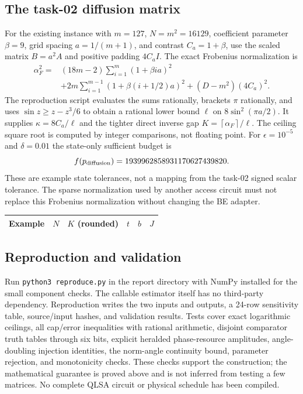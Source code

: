 \documentclass[11pt]{article}
\newcommand{\ceil}[1]{\left\lceil #1\right\rceil}
\begin{document}
\subsection{The task-02 diffusion matrix}
For the existing instance with $m=127$, $N=m^2=16129$, coefficient parameter $\beta=9$, grid spacing $a=1/(m+1)$, and contrast $C_a=1+\beta$, use the scaled matrix $B=a^2A$ and positive padding $4C_aI$. The exact Frobenius normalization is
\begin{align}
 \alpha_F^2={}&(18m-2)\sum_{i=1}^{m}(1+\beta ia)^2\nonumber\\
 &+2m\sum_{i=1}^{m-1}(1+\beta(i+1/2)a)^2
 +(D-m^2)(4C_a)^2.
\end{align}
The reproduction script evaluates the sums rationally, brackets $\pi$ rationally, and uses $\sin z\ge z-z^3/6$ to obtain a rational lower bound $\ell$ on $8\sin^2(\pi a/2)$. It supplies $\kappa=8C_a/\ell$ and the tighter direct inverse gap $K=\ceil{\alpha_F}/\ell$. The ceiling square root is computed by integer comparisons, not floating point. For $\epsilon=10^{-5}$ and $\delta=0.01$ the state-only sufficient budget is
\begin{equation}
 f(p_{\rm diffusion})=1939962858931170627439820.
\end{equation}
These are example state tolerances, not a mapping from the task-02 signed scalar tolerance. The sparse normalization used by another access circuit must not replace this Frobenius normalization without changing the BE adapter.
\begin{center}
\begin{tabular}{lrrrrr}
\toprule
Example & $N$ & $K$ (rounded) & $t$ & $b$ & $J$\\\midrule

\end{tabular}
\end{center}

\subsection{Reproduction and validation}
Run \texttt{python3 reproduce.py} in the report directory with NumPy installed for the small component checks. The callable estimator itself has no third-party dependency. Reproduction writes the two inputs and outputs, a 24-row sensitivity table, source/input hashes, and validation results. Tests cover exact logarithmic ceilings, all cap/error inequalities with rational arithmetic, disjoint comparator truth tables through six bits, explicit heralded phase-resource amplitudes, angle-doubling injection identities, the norm-angle continuity bound, parameter rejection, and monotonicity checks. These checks support the construction; the mathematical guarantee is proved above and is not inferred from testing a few matrices. No complete QLSA circuit or physical schedule has been compiled.
\end{document}
